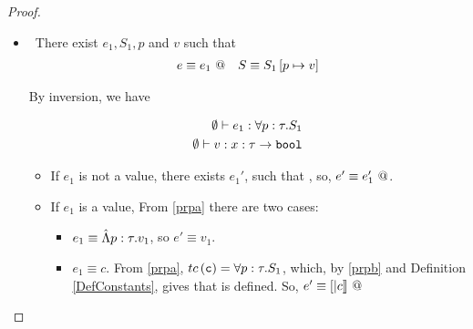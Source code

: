 \begin{proof}
\begin{itemize}
\item \tpinst\ There exist $e_1, S_1, p$ and $v$ such that
\begin{align*}
e \equiv {e_1} \ @ && S \equiv S_1 \left[ p \mapsto v \right] 
\end{align*}

By inversion, we have

\begin{align}
\emptyset \vdash e_1 : \forall p : \tau . S_1 \label{prpa}\\
\emptyset \vdash v : x : \tau \rightarrow \texttt{bool} \label{prpb}
\end{align} 

	\begin{itemize}
	\item If $e_1$ is not a value, 
	there exists $e_1'$, such that , 
	so, $e' \equiv {e_1'} \ @$.

	\item If $e_1$ is a value,
	 From \ref{prpa} there are two cases:

		\begin{itemize}
		\item $e_1 \equiv \hat{\Lambda} p : \tau . v_{1}$, so $e' \equiv v_1$.
		\item $e_1 \equiv c$.
		From \ref{prpa}, $tc\left(\texttt{c}\right) = \forall p : \tau . S_1$, 
		which, by \ref{prpb} and Definition \ref{DefConstants},
		gives that \epapp{[|c|]} is defined.
		So, $e' \equiv {[|c|]} \ @$
		\end{itemize}
	\end{itemize}
\end{itemize}
\end{proof}

